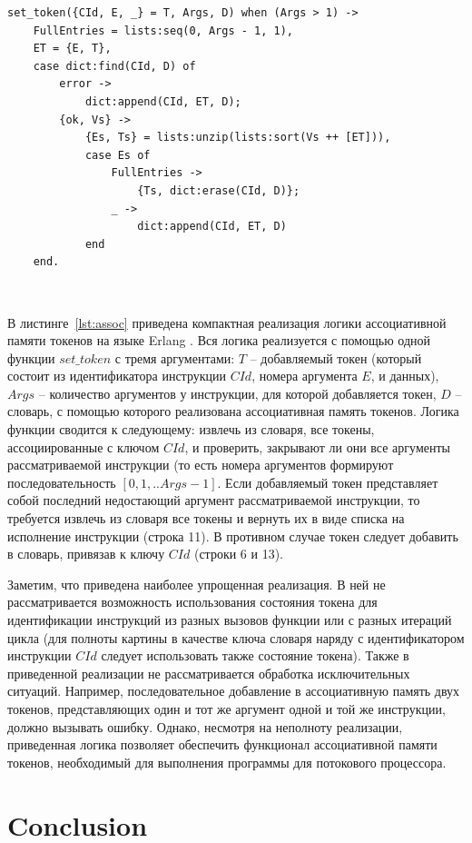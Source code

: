 \documentclass[
11pt,%
tightenlines,%
twoside,%
onecolumn,%
nofloats,%
nobibnotes,%
nofootinbib,%
superscriptaddress,%
noshowpacs,%
centertags]%
{revtex4}
\begin{document}
\begin{lstlisting}[caption={Реализация логики ассоциативной памяти токенов.},label={lst:assoc}]
set_token({CId, E, _} = T, Args, D) when (Args > 1) ->
	FullEntries = lists:seq(0, Args - 1, 1),
	ET = {E, T},
	case dict:find(CId, D) of
		error ->
			dict:append(CId, ET, D);
		{ok, Vs} ->
			{Es, Ts} = lists:unzip(lists:sort(Vs ++ [ET])),
			case Es of
				FullEntries ->
					{Ts, dict:erase(CId, D)};
				_ ->
					dict:append(CId, ET, D)
			end
	end.
\end{lstlisting}

\

В листинге~\ref{lst:assoc} приведена компактная реализация логики ассоциативной памяти токенов на языке Erlang \cite{Armstrong}.
Вся логика реализуется с помощью одной функции $set\_token$ с тремя аргументами: $T$ -- добавляемый токен (который состоит из идентификатора инструкции $CId$, номера аргумента $E$, и данных), $Args$ -- количество аргументов у инструкции, для которой добавляется токен, $D$ -- словарь, с помощью которого реализована ассоциативная память токенов.
Логика функции сводится к следующему: извлечь из словаря, все токены, ассоциированные с ключом $CId$, и проверить, закрывают ли они все аргументы рассматриваемой инструкции (то есть номера аргументов формируют последовательность $[0, 1, .. Args - 1]$.
Если добавляемый токен представляет собой последний недостающий аргумент рассматриваемой инструкции, то требуется извлечь из словаря все токены и вернуть их в виде списка на исполнение инструкции (строка 11).
В противном случае токен следует добавить в словарь, привязав к ключу $CId$ (строки 6 и 13).

Заметим, что приведена наиболее упрощенная реализация.
В ней не рассматривается возможность использования состояния токена для идентификации инструкций из разных вызовов функции или с разных итераций цикла (для полноты картины в качестве ключа словаря наряду с идентификатором инструкции $CId$ следует использовать также состояние токена).
Также в приведенной реализации не рассматривается обработка исключительных ситуаций.
Например, последовательное добавление в ассоциативную память двух токенов, представляющих один и тот же аргумент одной и той же инструкции, должно вызывать ошибку.
Однако, несмотря на неполноту реализации, приведенная логика позволяет обеспечить функционал ассоциативной памяти токенов, необходимый для выполнения программы для потокового процессора.

\section{Conclusion}
\end{document}
